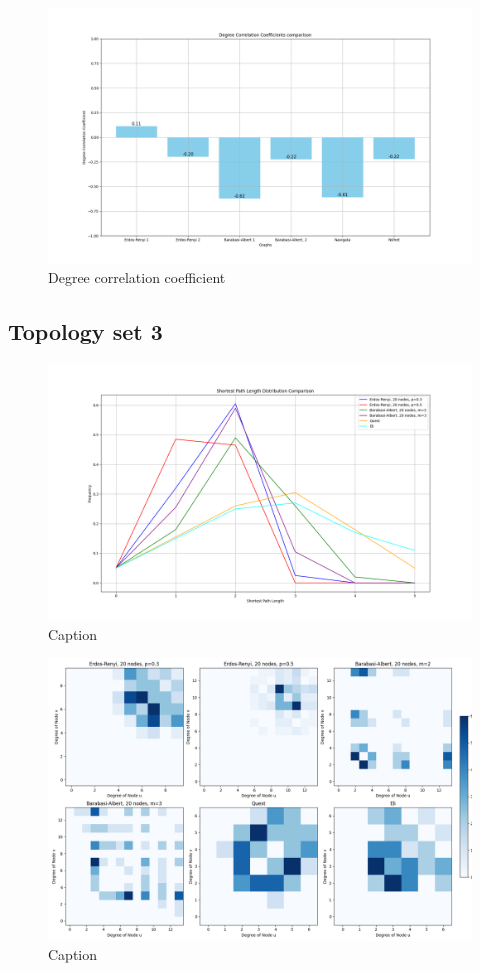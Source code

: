 \begin{figure}
    \centering
    \includegraphics[width=0.9\linewidth]{images/FINAL-TOPO-COMP/Degree-correlation-coeff/deg-coeff-13.png}
    \caption{Degree correlation coefficient}
    \label{fig:enter-label}
\end{figure}

\subsection{Topology set 3}
\begin{figure}
    \centering
    \includegraphics[width=0.9\linewidth]{images/FINAL-TOPO-COMP/line-20.png}
    \caption{Caption}
    \label{fig:enter-label}
\end{figure}

\begin{figure}
    \centering
    \includegraphics[width=0.9\linewidth]{images/FINAL-TOPO-COMP/Degree-correlation-matrices/20-matrix.png}
    \caption{Caption}
    \label{fig:enter-label}
\end{figure}


